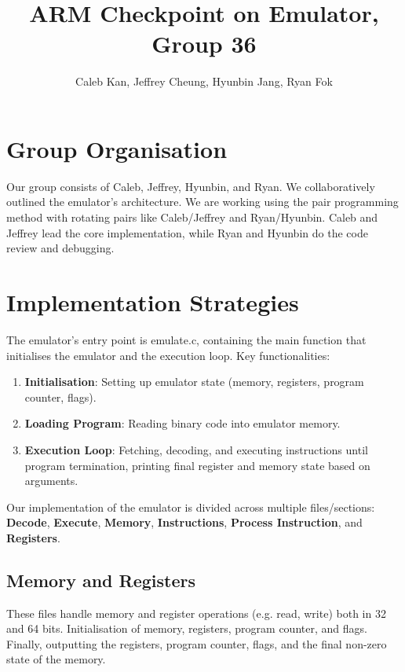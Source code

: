 \documentclass[10pt]{article}
\begin{document}
\title{ARM Checkpoint on Emulator, Group 36}
\author{Caleb Kan, Jeffrey Cheung, Hyunbin Jang, Ryan Fok}

\maketitle

\section{Group Organisation}

Our group consists of Caleb, Jeffrey, Hyunbin, and Ryan. We collaboratively outlined the emulator's architecture.
We are working using the pair programming method with rotating pairs like Caleb/Jeffrey and Ryan/Hyunbin. Caleb and Jeffrey lead the core implementation, while Ryan and Hyunbin do the code review and debugging.

\section{Implementation Strategies}
The emulator's entry point is emulate.c, containing the main function that initialises the emulator and the execution loop. Key functionalities:
\begin{enumerate}
\item \textbf{Initialisation}: Setting up emulator state (memory, registers, program counter, flags).
\item \textbf{Loading Program}: Reading binary code into emulator memory.
\item \textbf{Execution Loop}: Fetching, decoding, and executing instructions until program termination, printing final register and memory state based on arguments.
\end{enumerate}
Our implementation of the emulator is divided across multiple files/sections: \textbf{Decode}, \textbf{Execute}, \textbf{Memory}, \textbf{Instructions}, \textbf{Process Instruction}, and \textbf{Registers}.
\subsection{Memory and Registers}
These files handle memory and register operations (e.g. read, write) both in 32 and 64 bits. Initialisation of memory, registers, program counter, and flags. Finally, outputting the registers, program counter, flags, and the final non-zero state of the memory.
\end{document}
